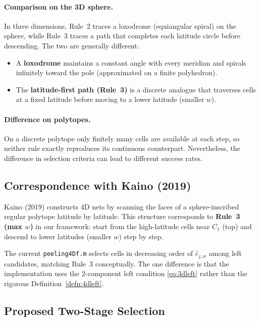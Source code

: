 \documentclass[12pt,a4paper]{article}
\theoremstyle{definition}
\begin{document}
\paragraph{Comparison on the 3D sphere.}
In three dimensions, Rule~2 traces a loxodrome (equiangular spiral) on
the sphere, while Rule~3 traces a path that completes each latitude circle
before descending.
The two are generally different:
\begin{itemize}
  \item A \textbf{loxodrome} maintains a constant angle with every meridian
        and spirals infinitely toward the pole (approximated on a finite polyhedron).
  \item The \textbf{latitude-first path (Rule~3)} is a discrete analogue that
        traverses cells at a fixed latitude before moving to a lower latitude
        (smaller $w$).
\end{itemize}

\paragraph{Difference on polytopes.}
On a discrete polytope only finitely many cells are available at each step,
so neither rule exactly reproduces its continuous counterpart.
Nevertheless, the difference in selection criteria can lead to different
success rates.

\subsection{Correspondence with Kaino (2019)}

Kaino (2019) constructs 4D nets by scanning the faces of a sphere-inscribed
regular polytope latitude by latitude.
This structure corresponds to \textbf{Rule~3 (max $w$)} in our framework:
start from the high-latitude cells near $C_1$ (top) and descend to lower
latitudes (smaller $w$) step by step.

The current \texttt{peeling4Df.m} selects cells in decreasing order of
$\hat{c}_{j,w}$ among left candidates, matching Rule~3 conceptually.
The one difference is that the implementation uses the 2-component left
condition \eqref{eq:3dleft} rather than the rigorous Definition~\ref{defn:4dleft}.

\subsection{Proposed Two-Stage Selection}
\end{document}
